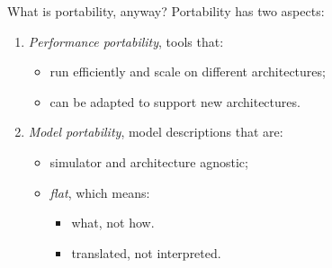\documentclass[aspectratio=43]{beamer}
\newcommand{\arbor}{{\ttfamily Arbor}\xspace}
\begin{document}
%

\begin{frame}[fragile]{What is portability, anyway?}
Portability has two aspects:

\begin{enumerate}
\item \emph{Performance portability}, tools that:
    \begin{itemize}
        \item run efficiently and scale on different architectures;
        \item can be adapted to support new architectures.
    \end{itemize}

    \item \emph{Model portability}, model descriptions that are:
    \begin{itemize}
        \item simulator and architecture agnostic;
        \item \emph{flat}, which means:
        \begin{itemize}
            \item what, not how.
            \item translated, not interpreted.
        \end{itemize}
    \end{itemize}
\end{enumerate}

\end{frame}
\end{document}

